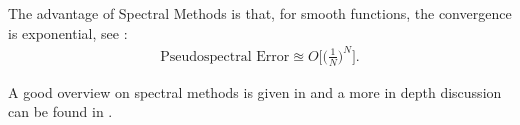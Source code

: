 The advantage of Spectral Methods is that, for smooth functions, the convergence is exponential, see \cite{Boyd1}:
\begin{align*}
\text{Pseudospectral Error} \approxeq O \bigg[ \bigg( \frac{1}{N} \bigg)^N \bigg].
\end{align*}


A good overview on spectral methods is given in \cite{bibTrefethen} and a more in depth discussion can be found in \cite{Boyd1}.
